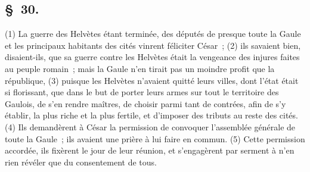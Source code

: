 \documentclass[french,twoside]{book} %
\begin{document}
\subsection[{§ 30.}]{ \textsc{§ 30.} }
\noindent (1) La guerre des Helvètes étant terminée, des députés de presque toute la Gaule et les principaux habitants des cités vinrent féliciter César ; (2) ils savaient bien, disaient-ils, que sa guerre contre les Helvètes était la vengeance des injures faites au peuple romain ; mais la Gaule n’en tirait pas un moindre profit que la république, (3) puisque les Helvètes n’avaient quitté leurs villes, dont l’état était si florissant, que dans le but de porter leurs armes sur tout le territoire des Gaulois, de s’en rendre maîtres, de choisir parmi tant de contrées, afin de s’y établir, la plus riche et la plus fertile, et d’imposer des tributs au reste des cités. (4) Ils demandèrent à César la permission de convoquer l’assemblée générale de toute la Gaule ; ils avaient une prière à lui faire en commun. (5) Cette permission accordée, ils fixèrent le jour de leur réunion, et s’engagèrent par serment à n’en rien révéler que du consentement de tous.
\end{document}
